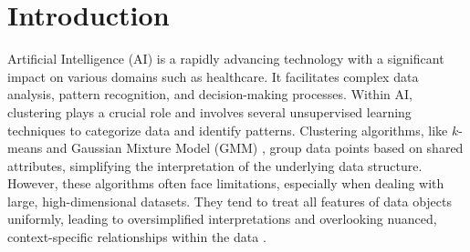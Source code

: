 
\section{Introduction}
Artificial Intelligence (AI) is a rapidly advancing technology with a significant impact on various domains such as healthcare. It facilitates complex data analysis, pattern recognition, and decision-making processes. Within AI, clustering plays a crucial role and involves several unsupervised learning techniques to categorize data and identify patterns. Clustering algorithms, like $k$-means \cite{lloyd1982LeastSquaresQuantization, macqueen1967MethodsClassificationAnalysis} and Gaussian Mixture Model (GMM) \cite{dempster1977MaximumLikelihoodIncomplete}, group data points based on shared attributes, simplifying the interpretation of the underlying data structure. However, these algorithms often face limitations, especially when dealing with large, high-dimensional datasets. They tend to treat all features of data objects uniformly, leading to oversimplified interpretations and overlooking nuanced, context-specific relationships within the data \cite{chen2023FastFlexibleBipartite, zhao2023MultiviewCoclusteringMultisimilarity, kumar2023CoclusteringBasedMethods}.

